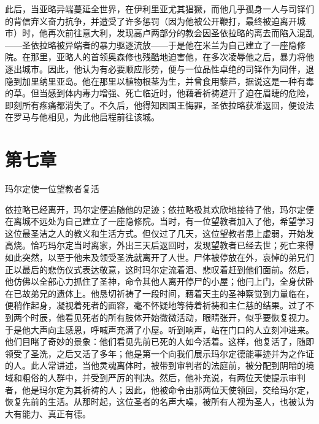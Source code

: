 此后，当亚略异端蔓延全世界，在伊利里亚尤其猖獗，而他几乎孤身一人与司铎们的背信弃义奋力抗争，并遭受了许多惩罚（因为他被公开鞭打，最终被迫离开城市）时，他再次前往意大利，发现高卢两部分的教会因圣依拉略的离去而陷入混乱——圣依拉略被异端者的暴力驱逐流放——于是他在米兰为自己建立了一座隐修院。在那里，亚略人的首领奥森修也残酷地迫害他，在多次凌辱他之后，暴力将他逐出城市。因此，他认为有必要顺应形势，便与一位品性卓绝的司铎作为同伴，退隐到加里纳里亚岛。他在那里以植物根茎为生，并曾食用藜芦，据说这是一种有毒的草。但当感到体内毒力增强、死亡临近时，他藉着祈祷避开了迫在眉睫的危险，即刻所有疼痛都消失了。不久后，他得知因国王悔罪，圣依拉略获准返回，便设法在罗马与他相见，为此他启程前往该城。\par


\section{第七章}

玛尔定使一位望教者复活\par

依拉略已经离开，玛尔定便追随他的足迹；依拉略极其欢欣地接待了他，玛尔定便在离城不远处为自己建立了一座隐修院。当时，有一位望教者加入了他，希望学习这位最圣洁之人的教义和生活方式。但仅过了几天，这位望教者患上虚弱，开始发高烧。恰巧玛尔定当时离家，外出三天后返回时，发现望教者已经去世；死亡来得如此突然，以至于他未及领受圣洗就离开了人世。尸体被停放在外，哀悼的弟兄们正以最后的悲伤仪式表达敬意，这时玛尔定流着泪、悲叹着赶到他们面前。然后，他仿佛以全部心力抓住了圣神，命令其他人离开停尸的小屋；他闩上门，全身伏卧在已故弟兄的遗体上。他恳切祈祷了一段时间，藉着天主的圣神察觉到力量临在，便稍作起身，凝视着死者的面容，毫不怀疑地等待着祈祷和主仁慈的结果。过了不到两个时辰，他看见死者的所有肢体开始微微活动，眼睛张开，似乎要恢复视力。于是他大声向主感恩，呼喊声充满了小屋。听到响声，站在门口的人立刻冲进来。他们目睹了奇妙的景象：他们看见先前已死的人如今活着。这样，他复活了，随即领受了圣洗，之后又活了多年；他是第一个向我们展示玛尔定德能事迹并为之作证的人。此人常讲述，当他灵魂离体时，被带到审判者的法庭前，被分配到阴暗的境域和粗俗的人群中，并受到严厉的判决。然后，他补充说，有两位天使提示审判者，他是玛尔定为其祈祷的人；因此，他被命令由那两位天使领回，交给玛尔定，恢复先前的生活。从那时起，这位圣者的名声大噪，被所有人视为圣人，也被认为大有能力、真正有德。\par


